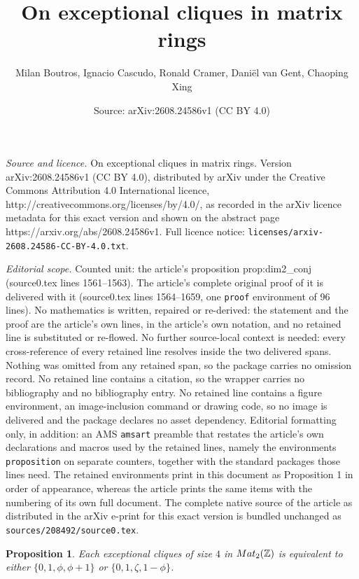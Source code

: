 \documentclass[10pt,a4paper]{amsart}
\title{On exceptional cliques in matrix rings}
\author{Milan Boutros, Ignacio Cascudo, Ronald Cramer, Dani\"el van Gent, Chaoping Xing}
\date{Source: arXiv:2608.24586v1 (CC BY 4.0)}
\newtheorem{proposition}{Proposition}
\newcommand{\Z}{\ensuremath{\mathbb{Z}}}
\begin{document}
\maketitle

\noindent\emph{Source and licence.} On exceptional cliques in matrix rings. Version arXiv:2608.24586v1 (CC BY 4.0), distributed by arXiv under the Creative Commons Attribution 4.0 International licence, http://creativecommons.org/licenses/by/4.0/, as recorded in the arXiv licence metadata for this exact version and shown on the abstract page https://arxiv.org/abs/2608.24586v1. Full licence notice: \texttt{licenses/arxiv-2608.24586-CC-BY-4.0.txt}.\par\smallskip

\noindent\textit{Editorial scope.} Counted unit: the article's proposition prop:dim2\_conj (source0.tex lines 1561--1563). The article's complete original proof of it is delivered with it (source0.tex lines 1564--1659, one \texttt{proof} environment of 96 lines). No mathematics is written, repaired or re-derived: the statement and the proof are the article's own lines, in the article's own notation, and no retained line is substituted or re-flowed.  No further source-local context is needed: every cross-reference of every retained line resolves inside the two delivered spans.  Nothing was omitted from any retained span, so the package carries no omission record.  No retained line contains a citation, so the wrapper carries no bibliography and no bibliography entry.  No retained line contains a figure environment, an image-inclusion command or drawing code, so no image is delivered and the package declares no asset dependency.  Editorial formatting only, in addition: an AMS \texttt{amsart} preamble that restates the article's own declarations and macros used by the retained lines, namely the environments \texttt{proposition} on separate counters, together with the standard packages those lines need.  The retained environments print in this document as Proposition 1 in order of appearance, whereas the article prints the same items with the numbering of its own full document.  The complete native source of the article as distributed in the arXiv e-print for this exact version is bundled unchanged as \texttt{sources/208492/source0.tex}.
	\begin{proposition}\label{prop:dim2_conj}
		Each exceptional cliques of size \(4\) in \(\textup{Mat}_2(\Z)\) is equivalent to either \(\{0,1,\phi,\phi+1\}\) or \(\{0,1,\zeta,1-\phi\}\).
	\end{proposition}
\end{document}
